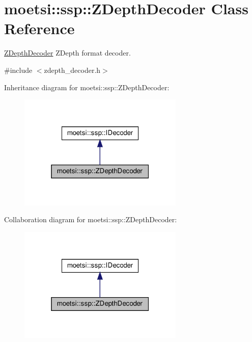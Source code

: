 \hypertarget{classmoetsi_1_1ssp_1_1ZDepthDecoder}{}\section{moetsi\+:\+:ssp\+:\+:Z\+Depth\+Decoder Class Reference}
\label{classmoetsi_1_1ssp_1_1ZDepthDecoder}


\hyperlink{classmoetsi_1_1ssp_1_1ZDepthDecoder}{Z\+Depth\+Decoder} Z\+Depth format decoder.  




{\ttfamily \#include $<$zdepth\+\_\+decoder.\+h$>$}



Inheritance diagram for moetsi\+:\+:ssp\+:\+:Z\+Depth\+Decoder\+:
\nopagebreak
\begin{figure}[H]
\begin{center}
\leavevmode
\includegraphics[width=223pt]{classmoetsi_1_1ssp_1_1ZDepthDecoder__inherit__graph}
\end{center}
\end{figure}


Collaboration diagram for moetsi\+:\+:ssp\+:\+:Z\+Depth\+Decoder\+:
\nopagebreak
\begin{figure}[H]
\begin{center}
\leavevmode
\includegraphics[width=223pt]{classmoetsi_1_1ssp_1_1ZDepthDecoder__coll__graph}
\end{center}
\end{figure}
